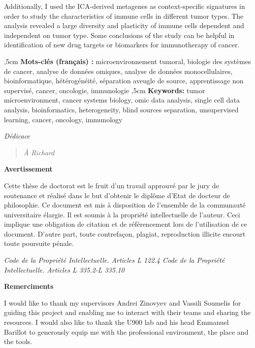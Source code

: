 \documentclass[12pt,]{book}
\theoremstyle{definition}
\theoremstyle{definition}
\theoremstyle{definition}
\theoremstyle{remark}
\begin{document}
\begin{titlepage}
Additionally, I used the ICA-derived metagenes as context-specific signatures in order to study the characteristics of immune cells in different tumor types. The analysis revealed a large diversity and plasticity of immune cells dependent and independent on tumor type. Some conclusions of the study can be helpful in identification of new drug targets or biomarkers for immunotherapy of cancer.

,5cm
\noindent
\textbf{Mots-clés (français) :} microenvironnement tumoral, biologie des systèmes de cancer, analyse de données omiques, analyse de données monocellulaires, bioinformatique, hétérogénéité,  séparation aveugle de source, apprentissage non supervisé, cancer, oncologie, immunologie
,5cm
\noindent
\textbf{Keywords:} tumor microenvironment, cancer systems biology, omic data analysis, single cell data analysis, bioinformatics, heterogeneity, blind sources separation, unsupervised learning, cancer, oncology, immunology


\newpage
\emph{Dédicace}
\vspace*{\fill}

\begin{quote}

\large{\centerline{\textit{À Richard}}}
 \end{quote}
 \vspace*{\fill}




\newpage
\thispagestyle{empty}
\begin{center}
\large{\textbf{Avertissement}}
\end{center}
\vspace{2cm}
Cette thèse de doctorat est le fruit d’un travail approuvé par le jury de soutenance et
réalisé dans le but d’obtenir le diplôme d’Etat de docteur de philosophie. Ce document
est mis à disposition de l’ensemble de la communauté universitaire élargie.
Il est soumis à la propriété intellectuelle de l’auteur. Ceci implique une obligation de
citation et de référencement lors de l’utilisation de ce document.
D’autre part, toute contrefaçon, plagiat, reproduction illicite encourt toute poursuite
pénale.
\vspace*{\fill}

\emph{Code de la Propriété Intellectuelle. Articles L 122.4 \newline
Code de la Propriété Intellectuelle. Articles L 335.2-L 335.10}


\newpage
\thispagestyle{empty}
\begin{center}
\large{\textbf{Remerciments}}
\end{center}
\vspace{2cm}
I would like to thank my supervisors Andrei Zinovyev and Vassili Soumelis for guiding this project and enabling me to interact with their teams and sharing the resources. 
I would also like to thank the U900 lab and his head Emmanuel Barillot to generously equip me with the professional environment, the place and the tools.


\end{titlepage}
\end{document}
